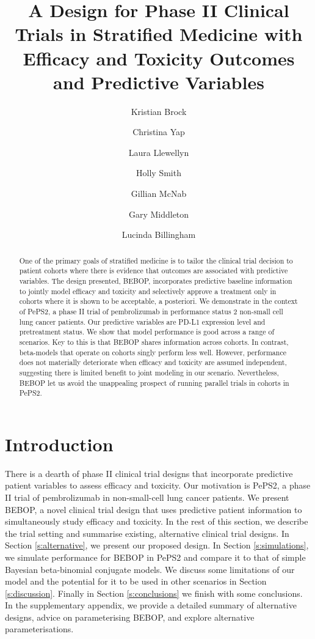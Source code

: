 \documentclass[alpha-refs]{wiley-article}
\title{A Design for Phase II Clinical Trials in Stratified Medicine with Efficacy and Toxicity Outcomes and Predictive Variables}
\author[1]{Kristian Brock}
\author[1]{Christina Yap}
\author[1]{Laura Llewellyn}
\author[1]{Holly Smith}
\author[1]{Gillian McNab}
\author[2\authfn{2}]{Gary Middleton}
\author[1\authfn{2}]{Lucinda Billingham}
\affil[1]{Cancer Research UK Clinical Trials Unit, University of Birmingham, Birmingham, B15 2TT, UK}
\affil[2]{Institute of Immunology and Immunotherapy, University of Birmingham, Birmingham, B15 2TT, UK}
\begin{document}
\maketitle

\begin{abstract}
One of the primary goals of stratified medicine is to tailor the clinical trial decision to patient cohorts where there is evidence that outcomes are associated with predictive variables.
The design presented, BEBOP, incorporates predictive baseline information to jointly model efficacy and toxicity and selectively approve a treatment only in cohorts where it is shown to be acceptable, a posteriori.
We demonstrate in the context of PePS2, a phase II trial of pembrolizumab in performance status 2 non-small cell lung cancer patients.
Our predictive variables are PD-L1 expression level and pretreatment status. 
We show that model performance is good across a range of scenarios.
Key to this is that BEBOP shares information across cohorts. 
In contrast, beta-models that operate on cohorts singly perform less well.
However, performance does not materially deteriorate when efficacy and toxicity are assumed independent, suggesting there is limited benefit to joint modeling in our scenario.
Nevertheless, BEBOP let us avoid the unappealing prospect of running parallel trials in cohorts in PePS2.


\end{abstract}



\section{Introduction}
\label{s:introduction}
There is a dearth of phase II clinical trial designs that incorporate predictive patient variables to assess efficacy and toxicity.
Our motivation is PePS2, a phase II trial of pembrolizumab in non-small-cell lung cancer patients.
We present BEBOP, a novel clinical trial design that uses predictive patient information to simultaneously study efficacy and toxicity.
In the rest of this section, we describe the trial setting and summarise existing, alternative clinical trial designs.
In Section \ref{s:alternative}, we present our proposed design.
In Section \ref{s:simulations}, we simulate performance for BEBOP in PePS2 and compare it to that of simple Bayesian beta-binomial conjugate models.
We discuss some limitations of our model and the potential for it to be used in other scenarios in Section \ref{s:discussion}.
Finally in Section \ref{s:conclusions} we finish with some conclusions.
In the supplementary appendix, we provide a detailed summary of alternative designs, advice on parameterising BEBOP, and explore alternative parameterisations.
\end{document}
